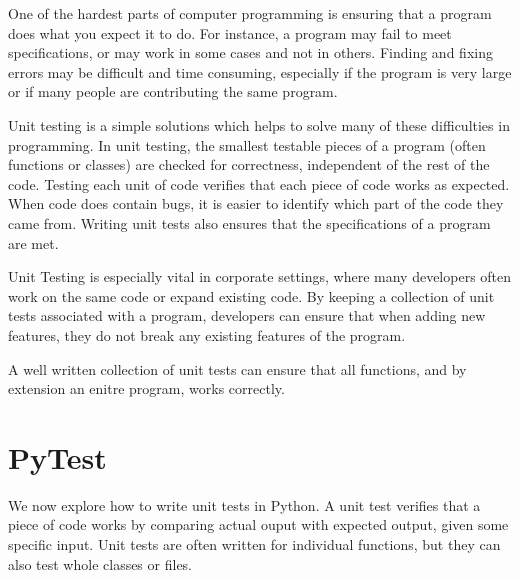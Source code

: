 



One of the hardest parts of computer programming is ensuring that a program does what you expect it to do. For instance, a program may fail to meet specifications, or may work in some cases and not in others. Finding and fixing errors may be difficult and time consuming, especially if the program is very large or if many people are contributing the same program. 

Unit testing is a simple solutions which helps to solve many of these difficulties in programming. In unit testing, the smallest testable pieces of a program (often functions or classes) are checked for correctness, independent of the rest of the code. Testing each unit of code verifies that each piece of code works as expected. When code does contain bugs, it is easier to identify which part of the code they came from. Writing unit tests also ensures that the specifications of a program are met.


Unit Testing is especially vital in corporate settings, where many developers often work on the same code or expand existing code. By keeping a collection of unit tests associated with a program, developers can ensure that when adding new features, they do not break any existing features of the program.

A well written collection of unit tests can ensure that all functions, and by extension an enitre program, works correctly.



\section*{PyTest}

We now explore how to write unit tests in Python. A unit test verifies that a piece of code works by comparing actual ouput with expected output, given some specific input. Unit tests are often written for individual functions, but they can also test whole classes or files.

